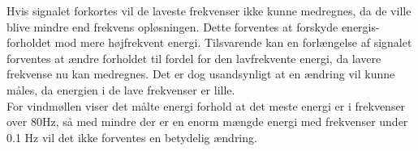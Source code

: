 Hvis signalet forkortes vil de laveste frekvenser ikke kunne medregnes, da de ville blive mindre end frekvens opløsningen. Dette forventes at forskyde energis-forholdet mod mere højfrekvent energi. Tilsvarende kan en forlængelse af signalet  forventes at ændre forholdet til fordel for den lavfrekvente energi, da lavere frekvense nu kan medregnes. Det er dog usandsynligt at en ændring vil kunne måles, da energien i de lave frekvenser er lille.\\

For vindmøllen viser det målte energi forhold at det meste energi er i frekvenser over 80Hz, så med mindre der er en enorm mængde energi med frekvenser under 0.1 Hz vil det ikke forventes en betydelig ændring.
